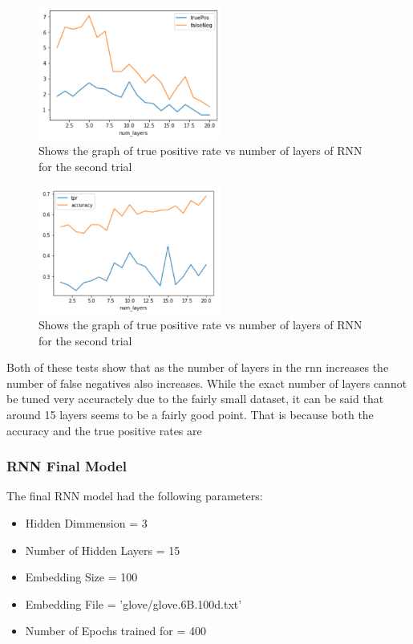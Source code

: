 \documentclass[twoside,twocolumn]{article}
\begin{document}
\begin{figure}[H]
\includegraphics[width=6cm]{rnn_numberLayers_test2}
\caption{Shows the graph of true positive rate vs number of layers of RNN for the second trial}
\centering
\end{figure}
  
\begin{figure}[H]
\includegraphics[width=6cm]{rnn_numberLayers_test2-tpr}
\caption{Shows the graph of true positive rate vs number of layers of RNN for the second trial}
\centering
\end{figure}

Both of these tests show that as the number of layers in the rnn increases the number of false
negatives also increases. While the exact number of layers cannot be tuned very accuractely
due to the fairly small dataset, it can be said that around 15 layers seems to be a fairly good point. 
That is because both the accuracy and the true positive rates are 


\subsubsection{RNN Final Model}

The final RNN model had the following parameters:
\begin{itemize}
\item Hidden Dimmension = 3
\item Number of Hidden Layers = 15
\item Embedding Size = 100
\item Embedding File = 'glove/glove.6B.100d.txt'
\item Number of Epochs trained for = 400 
\end{itemize}
\end{document}
